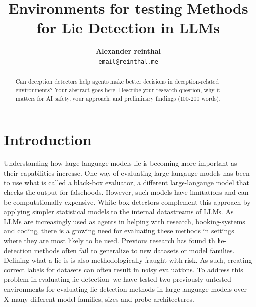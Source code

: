 \documentclass[midterm]{sparreport}
\title{Environments for testing Methods for Lie Detection in LLMs}
\author{
  \textbf{Alexander reinthal}\\
  \texttt{email@reinthal.me}
}
\begin{document}
\maketitle

\begin{abstract}
Can deception detectors help agents make better decisions in deception-related environments? Your abstract goes here. Describe your research question, why it matters for AI safety, your approach, and preliminary findings (100-200 words).
\end{abstract}


\section{Introduction}

Understanding how large language models lie is becoming more important as their capabilities increase.
One way of evaluating large langauge models has been to use what is called a black-box evaluator, a different large-langauge model that checks the output for falsehoods. 
However, such models have limitations and can be computationally expensive.
White-box detectors complement this approach by applying simpler statistical models to the internal datastreams of LLMs.
As LLMs are increasingly used as agents in helping with research, booking-systems and coding, there is a growing need for evaluating these methods in settings where they are most likely to be used.
Previous research has found th lie-detection methods often fail to generalize to new datasets or model families.
Defining what a lie is is also methodologically fraught with risk. 
As such, creating correct labels for datasets can often result in noisy evaluations.
To address this problem in evaluating lie detection, we have tested two previously untested environments for evaluating lie detection methods in large language models over X many different model families, sizes and probe architectures.
\end{document}
